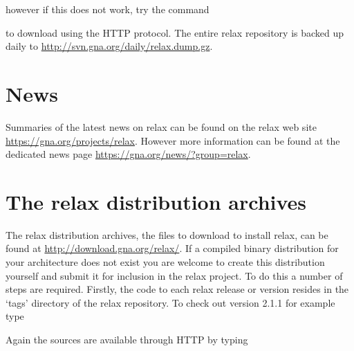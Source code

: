 
however if this does not work, try the command


to download using the HTTP protocol.  The entire relax repository is backed up daily to \href{http://svn.gna.org/daily/relax.dump.gz}{http://svn.gna.org/daily/relax.dump.gz}.




\section{News}

Summaries of the latest news on relax can be found on the relax web site \href{https://gna.org/projects/relax}{https://gna.org/projects/relax}.  However more information can be found at the dedicated news page \href{https://gna.org/news/?group=relax}{https://gna.org/news/?group=relax}.




\section{The relax distribution archives}

The relax distribution archives, the files to download to install relax, can be found at \href{http://download.gna.org/relax/}{http://download.gna.org/relax/}.  If a compiled binary distribution for your architecture does not exist you are welcome to create this distribution yourself and submit it for inclusion in the relax project.  To do this a number of steps are required.  Firstly, the code to each relax release or version resides in the `tags' directory of the relax repository.  To check out version 2.1.1 for example type


Again the sources are available through HTTP by typing


